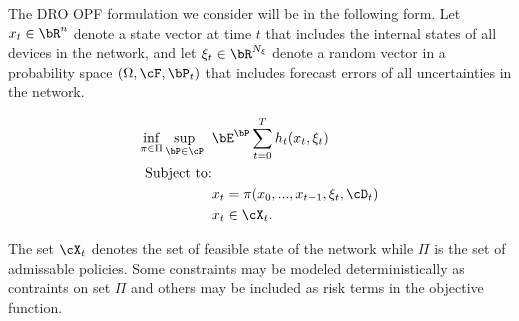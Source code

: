 \documentclass[11pt,a4paper,oneside,openany]{book}
\numberwithin{definition}{section}
\numberwithin{theorem}{section}
\numberwithin{problem}{section}
\begin{document}
The DRO OPF formulation we consider will be in the following form. Let $x_t \in \bR^n$  denote a state vector at time $t$ that includes the internal states of all devices in the network, and let $\xi_t \in \bR^{N_{\xi}}$ denote a random vector in a probability space $(\Omega, \cF, \bP_t)$ that includes forecast errors of all uncertainties  in the network.



\begin{align}
 \inf_{\pi \in \Pi} \sup_{\bP \in \cP} \; \;  & \bE^{\bP}\sum_{t=0}^{T}h_t(x_t,\xi_t) \\
\text{Subject to:} &  \nonumber \\
& x_t = \pi(x_0,...,x_{t-1},\xi_t,\cD_t) \\
& x_t\in \cX_t.
\end{align}

The set $\cX_t$ denotes the set of feasible state of the network while $\Pi$ is the set of admissable policies. Some constraints may be modeled deterministically as contraints on set $\Pi$ and others may
be included as risk terms in the objective function.
\end{document}
